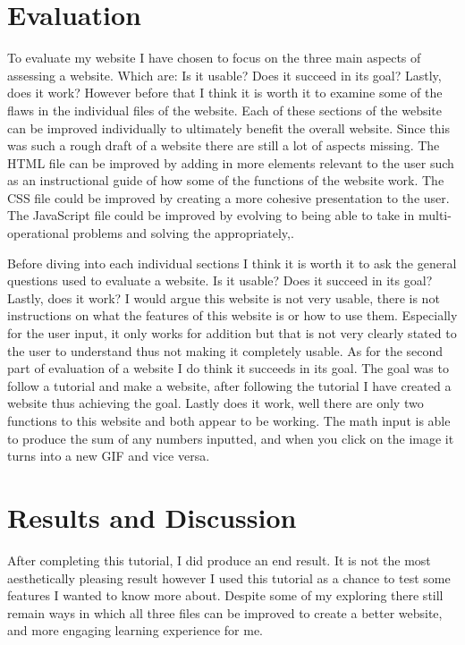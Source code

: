 \documentclass[10pt,twocolumn]{article}
\begin{document}
\section{Evaluation}
To evaluate my website I have chosen to focus on the three main aspects of assessing a website. Which are: Is it usable? Does it succeed in its goal? Lastly, does it work? However before that I think it is worth it to examine some of the flaws in the individual files of the website. Each of these sections of the website can be improved individually to ultimately benefit the overall website. Since this was such a rough draft of a website there are still a lot of aspects missing. The HTML file can be improved by adding in more elements relevant to the user such as an instructional guide of how some of the functions of the website work. The CSS file could be improved by creating a more cohesive presentation to the user. The JavaScript file could be improved by evolving to being able to take in multi-operational problems and solving the appropriately,. 

Before diving into each individual sections I think it is worth it to ask the general questions used to evaluate a website. Is it usable? Does it succeed in its goal? Lastly, does it work? I would argue this website is not very usable, there is not instructions on what the features of this website is or how to use them. Especially for the user input, it only works for addition but that is not very clearly stated to the user to understand thus not making it completely usable. As for the second part of evaluation of a website I do think it succeeds in its goal. The goal was to follow a tutorial and make a website, after following the tutorial I have created a website thus achieving the goal. Lastly does it work, well there are only two functions to this website and both appear to be working. The math input is able to produce the sum of any numbers inputted, and when you click on the image it turns into a new GIF and vice versa. 


\section{Results and Discussion}
After completing this tutorial, I did produce an end result. It is not the most aesthetically pleasing result however I used this tutorial as a chance to test some features I wanted to know more about. Despite some of my exploring there still remain ways in which all three files can be improved to create a better website, and more engaging learning experience for me.
\end{document}
